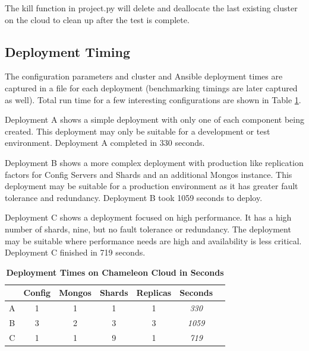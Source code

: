 \documentclass[9pt,twocolumn,twoside]{../../styles/osajnl}
\begin{document}
The kill function in project.py will delete and deallocate the last
existing cluster on the cloud to clean up after the test is complete.


\subsection{Deployment Timing}

The configuration parameters and cluster and Ansible deployment times
are captured in a file for each deployment (benchmarking timings are
later captured as well). Total run time for a few interesting
configurations are shown in Table \ref{tab:deploy-times}.

Deployment A shows a simple deployment with only one of each component
being created. This deployment may only be suitable for a development
or test environment. Deployment A completed in 330 seconds.

Deployment B shows a more complex deployment with production like
replication factors for Config Servers and Shards and an additional
Mongos instance. This deployment may be suitable for a production
environment as it has greater fault tolerance and redundancy.
Deployment B took 1059 seconds to deploy.

Deployment C shows a deployment focused on high performance. It has a
high number of shards, nine, but no fault tolerance or redundancy. The
deployment may be suitable where performance needs are high and
availability is less critical. Deployment C finished in 719 seconds.


\begin{table}[htbp]
\centering
\caption{\bf Deployment Times on Chameleon Cloud in Seconds}

  \begin{tabular}{| c | c | c | c | c | c | c |} 
 \hline
 & Config &  Mongos & Shards & Replicas & Seconds \\

 
 \hline
 A & 1 & 1 & 1 & 1 & \emph{330} \\
 \hline
 B & 3 & 2 & 3 & 3 & \emph{1059} \\
 \hline
 C & 1 & 1 & 9 & 1 & \emph{719} \\ [1ex] 
 \hline


\end{tabular}
  \label{tab:deploy-times}
\end{table}
\end{document}
